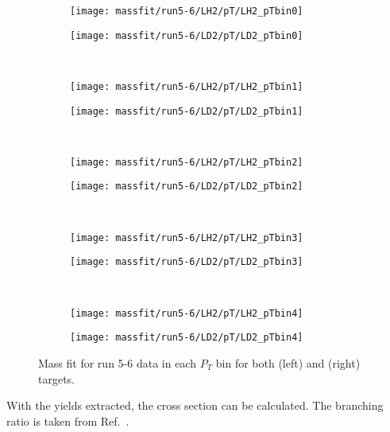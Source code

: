 \documentclass[../main.tex]{subfiles}
\begin{document}
\begin{figure}
	\centering
	\begin{subfigure}{0.4\linewidth}
		\texttt{[image: massfit/run5-6/LH2/pT/LH2\_pTbin0]}
	\end{subfigure}
	\begin{subfigure}{0.4\linewidth}
		\texttt{[image: massfit/run5-6/LD2/pT/LD2\_pTbin0]}
	\end{subfigure}\\
	\begin{subfigure}{0.4\linewidth}
		\texttt{[image: massfit/run5-6/LH2/pT/LH2\_pTbin1]}
	\end{subfigure}
	\begin{subfigure}{0.4\linewidth}
		\texttt{[image: massfit/run5-6/LD2/pT/LD2\_pTbin1]}
	\end{subfigure}\\
	\begin{subfigure}{0.4\linewidth}
		\texttt{[image: massfit/run5-6/LH2/pT/LH2\_pTbin2]}
	\end{subfigure}
	\begin{subfigure}{0.4\linewidth}
		\texttt{[image: massfit/run5-6/LD2/pT/LD2\_pTbin2]}
	\end{subfigure}\\
	\begin{subfigure}{0.4\linewidth}
		\texttt{[image: massfit/run5-6/LH2/pT/LH2\_pTbin3]}
	\end{subfigure}
	\begin{subfigure}{0.4\linewidth}
		\texttt{[image: massfit/run5-6/LD2/pT/LD2\_pTbin3]}
	\end{subfigure}\\
	\begin{subfigure}{0.4\linewidth}
		\texttt{[image: massfit/run5-6/LH2/pT/LH2\_pTbin4]}
	\end{subfigure}
	\begin{subfigure}{0.4\linewidth}
		\texttt{[image: massfit/run5-6/LD2/pT/LD2\_pTbin4]}
	\end{subfigure}
	\caption{Mass fit for run 5-6 data in each $P_T$ bin for both (left) and (right) targets. }
	\label{fig:massfit_5-6_pT}
\end{figure}

With the yields extracted, the cross section can be calculated. 
The branching ratio is taken from Ref.~\cite{workman2022}.
\end{document}
